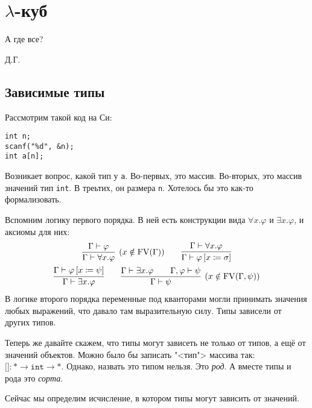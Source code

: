 \section{\texorpdfstring{$\lambda$-куб}{Lambda cube}}
\epigraph{А где все?}{Д.Г.}

\subsection{\texorpdfstring{Зависимые типы}{Depended types}}

Рассмотрим такой код на Си:
\begin{verbatim}
int n;
scanf("%d", &n);
int a[n];
\end{verbatim}
Возникает вопрос, какой тип у \texttt{a}.
Во-первых, это массив. Во-вторых, это массив значений тип \texttt{int}. В треьтих, он размера \texttt{n}.
Хотелось бы это как-то формализовать.

\begin{@empty}
Вспомним логику первого порядка.
В ней есть конструкции вида $\forall x . \varphi$ и $\exists x . \varphi$, и аксиомы для них: %
\inferspacing
\begin{gather*}
    \infer[(x \notin \FV(\Gamma))]{\Gamma \vdash \forall x . \varphi}{\Gamma \vdash \varphi} \qquad
    \infer{\Gamma \vdash \varphi \left[x \coloneqq \sigma\right]}{\Gamma \vdash \forall x . \varphi} \\
    \infer{\Gamma \vdash \exists x . \varphi}{\Gamma \vdash \varphi \left[x \coloneqq \psi\right]} \qquad
    \infer[(x \notin \FV(\Gamma, \psi))]{\Gamma \vdash \psi}{\Gamma \vdash \exists x . \varphi && \Gamma, \varphi \vdash \psi}
\end{gather*}
В логике второго порядка переменные под кванторами могли принимать значения любых выражений, что давало там выразительную силу.
Типы зависели от других типов.
\end{@empty}

Теперь же давайте скажем, что типы могут зависеть не только от типов, а ещё от значений объектов.
Можно было бы записать "<тип"> массива так: $\texttt{[]}: * \rightarrow \mathtt{int} \rightarrow *$.
Однако, назвать это типом нельзя. Это \emph{род}. А вместе типы и рода это \emph{сорта}.

Сейчас мы определим исчисление, в котором типы могут зависить от значений.


